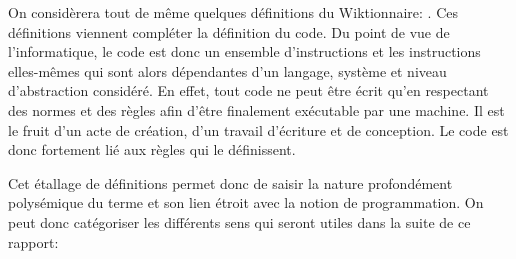 \documentclass[12pt]{article} %
\begin{document}
On considèrera tout de même quelques définitions du Wiktionnaire:
\cite{noauthor_undated-vw}. Ces définitions viennent compléter la définition du code. Du point de vue de l'informatique, le code est donc un ensemble d'instructions et les instructions elles-mêmes qui sont alors dépendantes d'un langage, système et niveau d'abstraction considéré. En effet, tout code ne peut être écrit qu'en respectant des normes et des règles afin d'être finalement exécutable par une machine. Il est le fruit d'un acte de création, d'un travail d'écriture et de conception. Le code est donc fortement lié aux règles qui le définissent. 

Cet étallage de définitions permet donc de saisir la nature profondément polysémique du terme et son lien étroit avec la notion de programmation. On peut donc catégoriser les différents sens qui seront utiles dans la suite de ce rapport:
\end{document}
